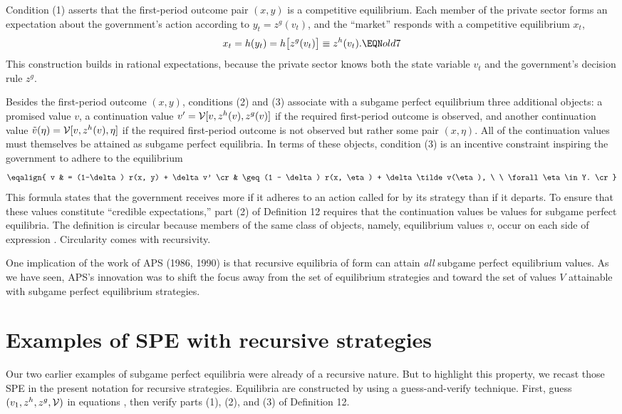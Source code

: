 Condition (1) asserts that the first-period outcome pair $(x,y)$ is a
competitive equilibrium. Each member of the private
 sector forms an expectation about the government's
action according to  $ y_t = z^g(v_t)$, and the ``market'' responds with
a competitive equilibrium $x_t$,
$$
x_t = h(y_t) = h\bigl[z^g(v_t)\bigr] \equiv z^h(v_t).  \EQN old7
$$
This construction
builds in rational expectations, because
the private sector knows both the state
variable $v_t$ and the government's decision rule $z^g$.


\medskip
Besides the first-period outcome $(x,y)$, conditions (2) and (3)
associate with a subgame perfect
equilibrium three additional objects: a promised value $v$,
 a continuation value $v' = {\cal V}[v, z^h(v),z^g(v)]$
 if the required first-period
 outcome  is observed, and another continuation value
$\tilde v(\eta) = {\cal V}[v,z^h(v),\eta]$
 if the required first-period outcome
is not observed but rather some pair $(x,\eta)$.
All of the continuation values must themselves
be attained as subgame perfect equilibria.
 In terms of these objects, condition (3)
is an incentive constraint inspiring the government
to adhere to the equilibrium
$$ \eqalign{ v & = (1-\delta) r(x, y) + \delta v' \cr
  & \geq (1 - \delta) r(x, \eta) + \delta \tilde v(\eta),
\ \ \forall \eta \in Y. \cr}$$
This formula states that the government receives more if it adheres
to an action called for by its strategy than if it
departs.  To ensure that these values constitute ``credible expectations,''
part (2) of Definition 12 requires that the continuation
values be values for subgame perfect equilibria.  The definition is
circular because members of the same class of objects, namely, equilibrium
values $v$, occur on each side of expression .
Circularity comes with recursivity.

   
 One implication of the work of APS (1986, 1990) is that recursive
equilibria of form  can attain {\it all\/} subgame perfect
equilibrium values.  As we have seen, APS's innovation was
to shift the focus away from the set of equilibrium strategies
and toward the set of values $V$ attainable with subgame perfect
equilibrium strategies.

\section{Examples of SPE with recursive strategies}
Our two earlier examples of subgame perfect equilibria were already of
a recursive nature. But to highlight this property, we recast those
SPE in the present notation for recursive strategies.
Equilibria are constructed by using a guess-and-verify
technique. First, guess  $(v_1,z^h,z^g,{\cal V})$ in equations , then
verify parts (1), (2), and (3) of Definition 12.

